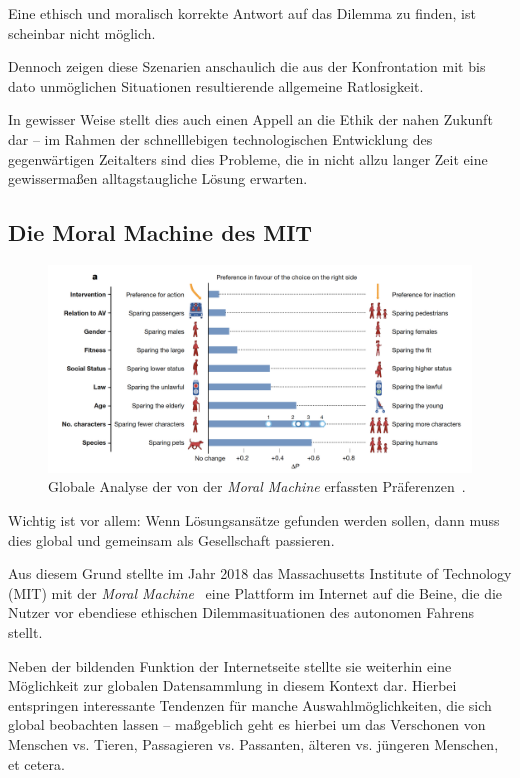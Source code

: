 \documentclass[twocolumn, german]{tum-article}
\begin{document}
Eine ethisch und moralisch korrekte Antwort auf das Dilemma zu finden, ist scheinbar nicht möglich.

Dennoch zeigen diese Szenarien anschaulich die aus der Konfrontation mit bis dato unmöglichen Situationen resultierende allgemeine Ratlosigkeit.

In gewisser Weise stellt dies auch einen Appell an die Ethik der nahen Zukunft dar -- im Rahmen der schnelllebigen technologischen Entwicklung des gegenwärtigen Zeitalters sind dies Probleme, die in nicht allzu langer Zeit eine gewissermaßen alltagstaugliche Lösung erwarten.


\subsection{Die Moral Machine des MIT}
\begin{figure}
	\includegraphics[width=\linewidth]{media/global-prefs}
	\caption{Globale Analyse der von der \emph{Moral Machine} erfassten Präferenzen~\cite[S. 61]{moral-machine}.}
	\label{fig:moral-preferences}
\end{figure}

Wichtig ist vor allem: Wenn Lösungsansätze gefunden werden sollen, dann muss dies global und gemeinsam als Gesellschaft passieren.

Aus diesem Grund stellte im Jahr 2018 das Massachusetts Institute of Technology (MIT) mit der \emph{Moral Machine}~\cite{moral-machine-web} eine Plattform im Internet auf die Beine, die die Nutzer vor ebendiese ethischen Dilemmasituationen des autonomen Fahrens stellt.

Neben der bildenden Funktion der Internetseite stellte sie weiterhin eine Möglichkeit zur globalen Datensammlung in diesem Kontext dar.
Hierbei entspringen interessante Tendenzen für manche Auswahlmöglichkeiten, die sich global beobachten lassen -- maßgeblich geht es hierbei um das Verschonen von Menschen vs. Tieren, Passagieren vs. Passanten, älteren vs. jüngeren Menschen, et cetera.
\end{document}
